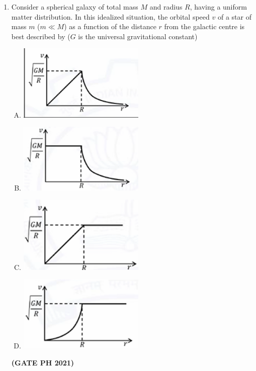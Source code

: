 \documentclass[14pt, a4paper]{extarticle}
\begin{document}
\begin{enumerate}[label=\textbf{Q.\arabic*}]
\begin{enumerate}[label=\textbf{Q.\arabic*}]
\item Consider a spherical galaxy of total mass $M$ and radius $R$, having a uniform matter distribution. In this idealized situation, the orbital speed $v$ of a star of mass $m$ ($m \ll M$) as a function of the distance $r$ from the galactic centre is best described by ($G$ is the universal gravitational constant)
\begin{enumerate}[(A)]
\item \includegraphics[width=0.5\textwidth]{figs/q49figa21.png}
\item \includegraphics[width=0.5\textwidth]{figs/q49figb21.png}
\item \includegraphics[width=0.5\textwidth]{figs/q49figc21.png}
\item \includegraphics[width=0.5\textwidth]{figs/q49figd21.png}
\end{enumerate}
\hfill \textbf{(GATE PH 2021)}


\end{enumerate}
\end{enumerate}
\end{document}
